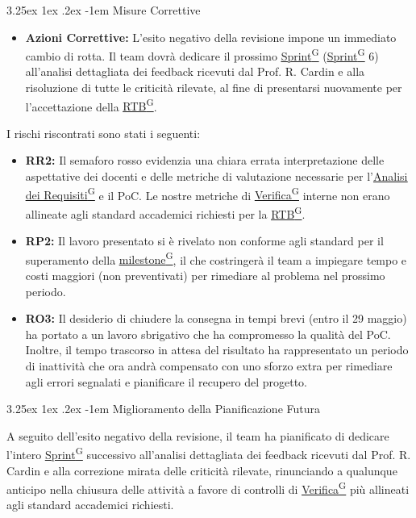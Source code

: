\documentclass[a4paper,12pt]{article}
\makeatletter
\renewcommand\paragraph{\@startsection{paragraph}{5}{\z@}%
  {3.25ex \@plus1ex \@minus.2ex}%
  {-1em}%
  {\normalfont\normalsize\bfseries}}
\providecommand{\glslink}[2]{\href{https://alittlebyte-19.github.io/Documentazione/glossario.html\#gls-#1}{\underline{#2}\textsuperscript{\scriptsize G}}}
\makeatother
\begin{document}
\paragraph{Misure Correttive}

\begin{itemize}
    \item \textbf{Azioni Correttive:} L'esito negativo della revisione impone un immediato cambio di rotta. Il team dovrà dedicare il prossimo \glslink{sprint}{Sprint} (\glslink{sprint}{Sprint} 6) all'analisi dettagliata dei feedback ricevuti dal Prof. R. Cardin e alla risoluzione di tutte le criticità rilevate, al fine di presentarsi nuovamente per l'accettazione della \glslink{rtb-requirements-and-technology-baseline}{RTB}.
\end{itemize}
I rischi riscontrati sono stati i seguenti:
\begin{itemize}
    \item \textbf{RR2:} Il semaforo rosso evidenzia una chiara errata interpretazione delle aspettative dei docenti e delle metriche di valutazione necessarie per l'\glslink{analisi-dei-requisiti-adr}{Analisi dei Requisiti} e il PoC. Le nostre metriche di \glslink{verificatore}{Verifica} interne non erano allineate agli standard accademici richiesti per la \glslink{rtb-requirements-and-technology-baseline}{RTB}.
    \item \textbf{RP2:} Il lavoro presentato si è rivelato non conforme agli standard per il superamento della \glslink{milestone}{milestone}, il che costringerà il team a impiegare tempo e costi maggiori (non preventivati) per rimediare al problema nel prossimo periodo.
    \item \textbf{RO3:} Il desiderio di chiudere la consegna in tempi brevi (entro il 29 maggio) ha portato a un lavoro sbrigativo che ha compromesso la qualità del PoC. Inoltre, il tempo trascorso in attesa del risultato ha rappresentato un periodo di inattività che ora andrà compensato con uno sforzo extra per rimediare agli errori segnalati e pianificare il recupero del progetto.
\end{itemize}


\paragraph{Miglioramento della Pianificazione Futura}

A seguito dell'esito negativo della revisione, il team ha pianificato di dedicare l'intero \glslink{sprint}{Sprint} successivo all'analisi dettagliata dei feedback ricevuti dal Prof. R. Cardin e alla correzione mirata delle criticità rilevate, rinunciando a qualunque anticipo nella chiusura delle attività a favore di controlli di \glslink{verificatore}{Verifica} più allineati agli standard accademici richiesti.
\end{document}
